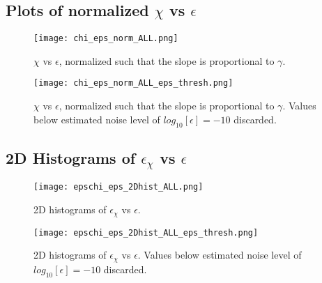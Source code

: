 \documentclass[11pt]{article}
\begin{document}
\clearpage
\subsection{Plots of normalized $\chi$ vs $\epsilon$}

\begin{figure}[htbp]
\texttt{[image: chi\_eps\_norm\_ALL.png]}
\caption{$\chi$ vs $\epsilon$, normalized such that the slope is proportional to $\gamma$.}
\label{}
\end{figure}


\begin{figure}[htbp]
\texttt{[image: chi\_eps\_norm\_ALL\_eps\_thresh.png]}
\caption{$\chi$ vs $\epsilon$, normalized such that the slope is proportional to $\gamma$. Values below estimated noise level of $log_{10}[\epsilon]=-10$ discarded.}
\label{}
\end{figure}







\clearpage
\subsection{2D Histograms of $\epsilon_{\chi}$ vs $\epsilon$}

\begin{figure}[htbp]
\texttt{[image: epschi\_eps\_2Dhist\_ALL.png]}
\caption{2D histograms of $\epsilon_{\chi}$ vs $\epsilon$.}
\label{}
\end{figure}


\begin{figure}[htbp]
\texttt{[image: epschi\_eps\_2Dhist\_ALL\_eps\_thresh.png]}
\caption{2D histograms of $\epsilon_{\chi}$ vs $\epsilon$. Values below estimated noise level of $log_{10}[\epsilon]=-10$ discarded.}
\label{}
\end{figure}








\end{document}
